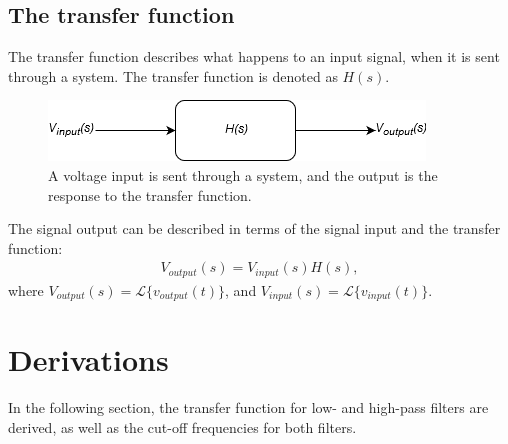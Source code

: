 \subsection{The transfer function} \label{sub:TTF}
The transfer function describes what happens to an input signal, when it is sent through a system. The transfer function is denoted as $H(s)$.
\\
\begin{figure}[H]
\center
\includegraphics[scale=0.6]{fig/img/transfer_function.png}
\caption{A voltage input is sent through a system, and the output is the response to the transfer function.}
\label{fig:transfer}
\end{figure}
\noindent
The signal output can be described in terms of the signal input and the transfer function:
\begin{align*}
V_{output}(s)=V_{input}(s)H(s),
\end{align*}
where $V_{output}(s)=\mathcal{L}\{v_{output}(t)\}$, and $V_{input}(s)=\mathcal{L}\{v_{input}(t)\}$.

\section{Derivations} \label{Derivations}
In the following section, the transfer function for low- and high-pass filters are derived, as well as the cut-off frequencies for both filters.

